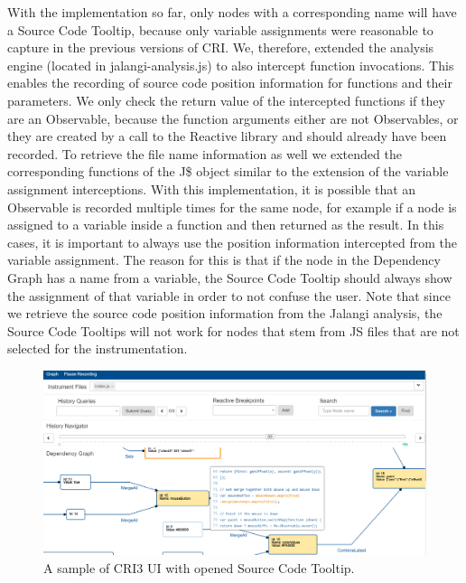 With the implementation so far, only nodes with a corresponding name will have a Source Code Tooltip, because only variable assignments were reasonable to capture in the previous versions of CRI. We, therefore, extended the analysis engine (located in jalangi-analysis.js) to also intercept function invocations. This enables the recording of source code position information for functions and their parameters. We only check the return value of the intercepted functions if they are an Observable, because the function arguments either are not Observables, or they are created by a call to the Reactive library and should already have been recorded. To retrieve the file name information as well we extended the corresponding functions of the J\$ object similar to the extension of the variable assignment interceptions. With this implementation, it is possible that an Observable is recorded multiple times for the same node, for example if a node is assigned to a variable inside a function and then returned as the result. In this cases, it is important to always use the position information intercepted from the variable assignment. The reason for this is that if the node in the Dependency Graph has a name from a variable, the Source Code Tooltip should always show the assignment of that variable in order to not confuse the user. Note that since we retrieve the source code position information from the Jalangi analysis, the Source Code Tooltips will not work for nodes that stem from JS files that are not selected for the instrumentation.\\

\begin{figure}[!h]
	\centering
	\includegraphics[scale=0.5,trim=0 0 0 0]{gfx/CRI-sampleView.png}
	\caption{A sample of CRI3 UI with opened Source Code Tooltip.}
	\label{fig:CRI}
\end{figure}

